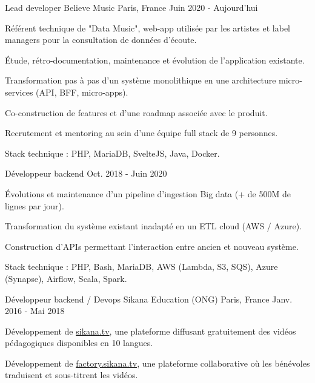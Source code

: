 \begin{cventries}
  \cventry
    {Lead developer}
    {Believe Music}
    {Paris, France}
    {Juin 2020 - Aujourd'hui}
    {
      \begin{cvitems}
        \item {Référent technique de "Data Music", web-app utilisée par les artistes et label managers pour la consultation de données d'écoute.}
        \item {Étude, rétro-documentation, maintenance et évolution de l'application existante.}
        \item {Transformation pas à pas d'un système monolithique en une architecture micro-services (API, BFF, micro-apps).}
        \item {Co-construction de features et d'une roadmap associée avec le produit.}
        \item {Recrutement et mentoring au sein d'une équipe full stack de 9 personnes.}
        \item {Stack technique : PHP, MariaDB, SvelteJS, Java, Docker.}
      \end{cvitems}
      \vspace{-2.0mm}
    }
  \cventry
    {Développeur backend}
    {}
    {}
    {Oct. 2018 - Juin 2020}
    {
      \begin{cvitems}
        \item {Évolutions et maintenance d'un pipeline d'ingestion Big data (+ de 500M de lignes par jour).}
        \item {Transformation du système existant inadapté en un ETL cloud (AWS / Azure).}
        \item {Construction d'APIs permettant l'interaction entre ancien et nouveau système.}
        \item {Stack technique : PHP, Bash, MariaDB, AWS (Lambda, S3, SQS), Azure (Synapse), Airflow, Scala, Spark.}
      \end{cvitems}
    }
  \cventry
    {Développeur backend / Devops}
    {Sikana Education (ONG)}
    {Paris, France}
    {Janv. 2016 - Mai 2018}
    {
      \begin{cvitems}
        \item {Développement de \href{https://sikana.tv}{sikana.tv}, une plateforme diffusant gratuitement des vidéos pédagogiques disponibles en 10 langues.}
        \item {Développement de \href{https://factory.sikana.tv}{factory.sikana.tv}, une plateforme collaborative où les bénévoles traduisent et sous-titrent les vidéos.}

\end{cvitems}}
\end{cventries}
